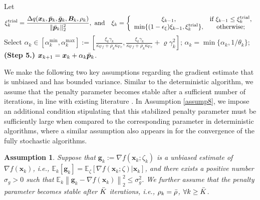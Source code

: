 \documentclass[aos]{imsart}
\numberwithin{equation}{section}
\theoremstyle{plain}
\newtheorem{assumption}{Assumption}
\begin{document}
\begin{algorithm}[htb]
\begin{algorithmic}[1]
  \STATE Let 
  \begin{equation}
  \label{strategy_xi}
   \xi_{k}^{\text{trial}} =  \frac{\Delta q(\bm{x}_k,\Bar{\bm{p}}_k, \Bar{\bm{g}}_k,\bm{B}_k,\rho_k)}{\|\Bar{\bm{p}}_k\|_2^2},
 ~  \text{and} \quad
      \xi_k = \left\{ \begin{array}{cc}
          \xi_{k-1}, & \text{if}~\xi_{k-1} \leq \xi_{k}^{\text{trial}},  \\
          \min\{(1-\epsilon_{\xi})\xi_{k-1},\xi_{k}^{\text{trial}}\},  & \text{otherwise;}
      \end{array} \right.
  \end{equation}
  \STATE Select $\alpha_k \in \left[\alpha_k^{\text{min}}, \alpha_k^{\max} \right] :=  \left[ \frac{ \xi_{k}\gamma_k}{\kappa_{\nabla f} + \rho_k \kappa_{\nabla c}} , \frac{ \xi_{k}\gamma_k}{\kappa_{\nabla f} + \rho_k \kappa_{\nabla c}} + \varrho \gamma_k^2 \right]$;
  \STATE $\alpha_k = \min\{\alpha_k,1/\theta_k\}$;
  \STATE \textbf{(Step 5.)} $\bm{x}_{k+1} = \bm{x}_{k} + \alpha_k \Bar{\bm{p}}_{k}$.
  \ENDFOR
 \end{algorithmic}
 \end{algorithm}
 
We make the following two key assumptions regarding the gradient estimate that is unbiased and has bounded variance. Similar to the deterministic algorithm, we assume that the penalty parameter becomes stable after a sufficient number of iterations, in line with existing literature \cite{berahas2021sequential, qiu2023sequential}. In Assumption \ref{assump8}, we impose an additional condition stipulating that this stabilized penalty parameter must be sufficiently large when compared to the corresponding parameter in deterministic algorithms, where a similar assumption also appears in \cite{berahas2021sequential} for the convergence of the fully stochastic algorithms. 

\begin{assumption}
\label{assump3}
    Suppose that $\bm{g}_k:= \nabla f(\bm{x}_k;\zeta_k)$ is a unbiased estimate of $\nabla f(\bm{x}_k)$, i.e., $\mathbb{E}_k[\bm{g}_k] = \mathbb{E}_{\zeta}\left[ \nabla f(\bm{x}_k;\zeta)|\bm{x}_k\right] $, and there exists a positive number $\sigma_{g}>0$ such that $\mathbb{E}_{k}\left\|\bm{g}_k - \nabla f(\bm{x}_k)  \right\|_2^2 \leq \sigma_{g}^2$. We further assume that the penalty parameter becomes stable after $\Bar{K}$ iterations, i.e., $\rho_k = \Bar{\rho}$, $\forall k \geq \Bar{K}$. 
\end{assumption}
\end{document}
